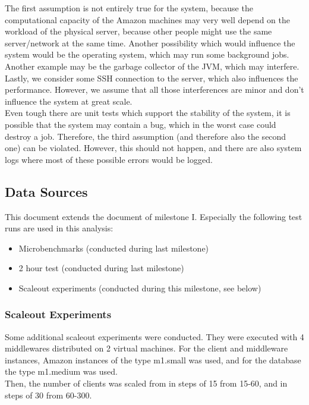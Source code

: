 \documentclass[a4paper]{article}
\begin{document}
The first assumption is not entirely true for the system, because the computational capacity of the Amazon machines may very well depend on the workload of the physical server, because other people might use the same server/network at the same time. Another possibility which would influence the system would be the operating system, which may run some background jobs. Another example may be the garbage collector of the JVM, which may interfere. Lastly, we consider some SSH connection to the server, which also influences the performance. However, we assume that all those interferences are minor and don't influence the system at great scale.\\

Even tough there are unit tests which support the stability of the system, it is possible that the system may contain a bug, which in the worst case could destroy a job. Therefore, the third assumption (and therefore also the second one) can be violated. However, this should not happen, and there are also system logs where most of these possible errors would be logged.\\

\subsection{Data Sources}

This document extends the document of milestone I\cite{milestone1}. Especially the following test runs are used in this analysis:

\begin{itemize}
\item Microbenchmarks (conducted during last milestone\cite{milestone1})
\item 2 hour test (conducted during last milestone\cite{milestone1})
\item Scaleout experiments (conducted during this milestone, see below)
\end{itemize}

\subsubsection{Scaleout Experiments}

Some additional scaleout experiments were conducted. They were executed with 4 middlewares distributed on 2 virtual machines. For the client and middleware instances, Amazon instances of the type m1.small was used, and for the database the type m1.medium was used.\\
\noindent Then, the number of clients was scaled from in steps of 15 from 15-60, and in steps of 30 from 60-300.
\end{document}
